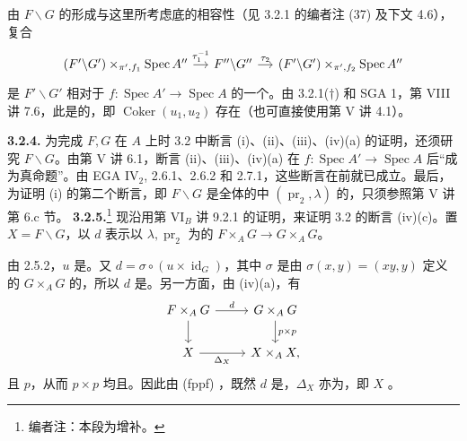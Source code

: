 由 $F\backslash G$ 的形成与这里所考虑底的相容性（见 3.2.1 的编者注 (37) 及下文 4.6），复合
\[
\begin{tikzcd}[column sep=small]
(F'\backslash G')\times_{\pi',f_1}\operatorname{Spec}A''\arrow[r,"\tau_1^{-1}"]&F''\backslash G''\arrow[r,"\tau_2"]&(F'\backslash G')\times_{\pi',f_2}\operatorname{Spec}A''
\end{tikzcd}
\]
是 $F'\backslash G'$ 相对于 $f:\operatorname{Spec}A'\to\operatorname{Spec}A$ 的一个。由 3.2.1($\dagger$) 和 SGA 1，第 VIII 讲 7.6，此是的，即 $\operatorname{Coker}(u_1,u_2)$ 存在（也可直接使用第 V 讲 4.1）。

\textbf{3.2.4.} 为完成 $F,G$ 在 $A$ 上时 3.2 中断言 (i)、(ii)、(iii)、(iv)(a) 的证明，还须研究 $F\backslash G$。由第 V 讲 6.1，断言 (ii)、(iii)、(iv)(a) 在 $f:\operatorname{Spec}A'\to\operatorname{Spec}A$ 后“成为真命题”。由 EGA IV$_2$, 2.6.1、2.6.2 和 2.7.1，这些断言在前就已成立。最后，为证明 (i) 的第二个断言，即 $F\backslash G$ 是全体的中 $(\operatorname{pr}_2,\lambda)$ 的，只须参照第 V 讲第 6.c 节。
\textbf{3.2.5.}\footnote{编者注：本段为增补。} 现沿用第 VI$_B$ 讲 9.2.1 的证明，来证明 3.2 的断言 (iv)(c)。置 $X=F\backslash G$，以 $d$ 表示以 $\lambda,\operatorname{pr}_2$ 为的 $F\times_A G\to G\times_A G$。

由 2.5.2，$u$ 是。又 $d=\sigma\circ(u\times\operatorname{id}_G)$，其中 $\sigma$ 是由 $\sigma(x,y)=(xy,y)$ 定义的 $G\times_A G$ 的，所以 $d$ 是。另一方面，由 (iv)(a)，有
\[
\begin{tikzcd}
F\times_A G\arrow[r,"d"]\arrow[d]&G\times_A G\arrow[d,"p\times p"]\\
X\arrow[r,"\Delta_X"']&X\times_A X,
\end{tikzcd}
\]
且 $p$，从而 $p\times p$ 均且。因此由 (fppf) ，既然 $d$ 是，$\Delta_X$ 亦为，即 $X$ 。

